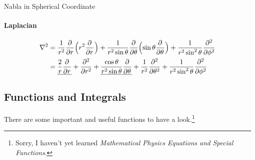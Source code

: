 \documentclass{article}
\begin{document}
\begin{example}{Nabla in Spherical Coordinate}{}
	\paragraph{Laplacian}
	\begin{align*}
		\laplacian & =\frac1{r^2}\pp r\Bigp{r^2\pp r}+\frac1{r^2\sin\theta}\pp \theta\Bigp{\sin\theta\pp \theta}+\frac1{r^2\sin^2\theta}\pp[2]\phi                        \\
		         & =\underline{\frac2r\pp r}+\pp[2]r+\underline{\frac{\cos\theta}{r^2\sin\theta}\pp \theta}+\frac1{r^2}\pp[2]\theta+\frac1{r^2\sin^2\theta}\pp[2]\phi
	\end{align*}
\end{example}
\subsection{Functions and Integrals}
There are some important and useful functions to have a look.\footnote{Sorry, I haven't yet learned \textit{Mathematical Physics Equations and Special Functions}.}
\setcounter{subsubsection}{-1}
\end{document}
